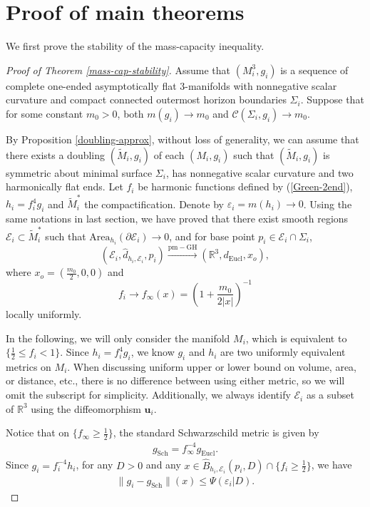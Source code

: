 \documentclass[letter]{amsart}
\theoremstyle{definition}
\theoremstyle{remark}
\def\Area{\mathrm{Area}}
\begin{document}
\section{Proof of main theorems}
We first prove the stability of the mass-capacity inequality.
\begin{proof}[Proof of Theorem \ref{mass-cap-stability}]
	Assume that $(M_i^3, g_i)$ is a sequence of complete one-ended asymptotically flat $3$-manifolds with nonnegative scalar curvature and compact connected outermost horizon boundaries $\Sigma_i$. Suppose that for some constant $m_0>0$, both $m(g_i) \to m_0$ and $  \mathcal{C}(\Sigma_i, g_i) \to m_0$. 

By Proposition \ref{doubling-approx}, without loss of generality, we can assume that there exists a doubling $(\tilde{M}_i, g_i)$ of each $(M_i, g_i)$ such that $(\tilde{M}_i, g_i)$ is symmetric about minimal surface $\Sigma_i$, has nonnegative scalar curvature and two harmonically flat ends. Let $f_i$ be harmonic functions defined by (\ref{Green-2end}), $h_i= f_i^{4} g_i$ and $\tilde{M}^*_i$ the compactification. Denote by $\varepsilon _i = m(h_i) \to 0$. Using the same notations in last section, we have proved that there exist smooth regions $\mathcal{E}_i \subset \tilde{M}^*_i$ such that $\Area_{h_i}(\partial \mathcal{E}_i) \to 0$, and for base point $p_i \in \mathcal{E}_i \cap \Sigma_i$,
$$
(\mathcal{E}_i, \hat{d}_{h_i, \mathcal{E}_i}, p_i) \xrightarrow{\mathrm{pm-GH}} (\mathbb{R}^3, d_{\mathrm{Eucl}}, x_o),
$$ 
where $x_o=(\frac{m_0}{2}, 0,0)$
and 
$$f_i \to f_\infty(x) = \left( 1+ \frac{m_0}{2|x|} \right) ^{-1}$$
locally uniformly. 


	In the following, we will only consider the manifold $M_i$, which is equivalent to $\{ \frac{1}{2} \leq f_i < 1\} $. Since $h_i = f_i^{4}g_i$, we know $g_i$ and $h_i$ are two uniformly equivalent metrics on $M_i$. When discussing uniform upper or lower bound on volume, area, or distance, etc., there is no difference between using either metric, so we will omit the subscript for simplicity. Additionally, we always identify $\mathcal{E}_i$ as a subset of $\mathbb{R}^3$  using the diffeomorphism $\mathbf{u}_i$. 

Notice that on $\{f_\infty \geq \frac{1}{2}\} $, the standard Schwarzschild metric is given by
\begin{align*}
	g_{\mathrm{Sch}} = f_\infty^{-4} g_{\mathrm{Eucl}}.
\end{align*}
Since $g_i = f_i^{-4} h_i$, for any $D>0$ and any $x \in \hat{B}_{h_i, \mathcal{E}_i}(p_i, D) \cap \{f_i \geq \frac{1}{2}\} $, we have
\begin{align*}
	\| g_i - g_{\mathrm{Sch}} \|(x) \leq \Psi (\varepsilon _i| D).
\end{align*}




\end{proof}
\end{document}
